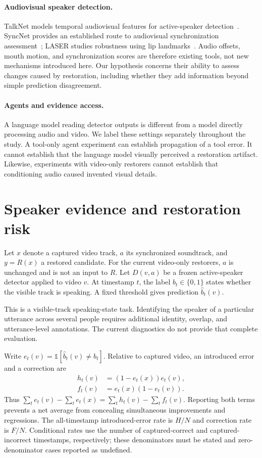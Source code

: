 \paragraph{Audiovisual speaker detection.}
TalkNet models temporal audiovisual features for active-speaker detection~\cite{talknet}. SyncNet provides an established route to audiovisual synchronization assessment~\cite{syncnet}; LASER studies robustness using lip landmarks~\cite{laser}. Audio offsets, mouth motion, and synchronization scores are therefore existing tools, not new mechanisms introduced here. Our hypothesis concerns their ability to assess changes caused by restoration, including whether they add information beyond simple prediction disagreement.

\paragraph{Agents and evidence access.}
A language model reading detector outputs is different from a model directly processing audio and video. We label these settings separately throughout the study. A tool-only agent experiment can establish propagation of a tool error. It cannot establish that the language model visually perceived a restoration artifact. Likewise, experiments with video-only restorers cannot establish that conditioning audio caused invented visual details.

\section{Speaker evidence and restoration risk}
Let $x$ denote a captured video track, $a$ its synchronized soundtrack, and $y=R(x)$ a restored candidate. For the current video-only restorers, $a$ is unchanged and is not an input to $R$. Let $D(v,a)$ be a frozen active-speaker detector applied to video $v$. At timestamp $t$, the label $b_t\in\{0,1\}$ states whether the visible track is speaking. A fixed threshold gives prediction $\hat b_t(v)$.

This is a visible-track speaking-state task. Identifying the speaker of a particular utterance across several people requires additional identity, overlap, and utterance-level annotations. The current diagnostics do not provide that complete evaluation.

Write $e_t(v)=\mathbb{1}[\hat b_t(v)\ne b_t]$. Relative to captured video, an introduced error and a correction are
\begin{align}
h_t(v)&=(1-e_t(x))e_t(v),\\
f_t(v)&=e_t(x)(1-e_t(v)).
\end{align}
Thus $\sum_t e_t(v)-\sum_t e_t(x)=\sum_t h_t(v)-\sum_t f_t(v)$. Reporting both terms prevents a net average from concealing simultaneous improvements and regressions. The all-timestamp introduced-error rate is $H/N$ and correction rate is $F/N$. Conditional rates use the number of captured-correct and captured-incorrect timestamps, respectively; these denominators must be stated and zero-denominator cases reported as undefined.

